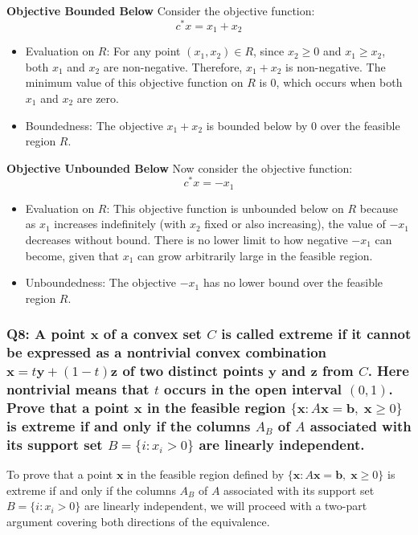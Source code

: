 \documentclass[8pt]{article}
\begin{document}
\textbf{Objective Bounded Below}
Consider the objective function:
\[
c^*x = x_1 + x_2
\]
\begin{itemize}
    \item Evaluation on \(R\): For any point \((x_1, x_2) \in R\), since \(x_2 \geq 0\) and \(x_1 \geq x_2\), both \(x_1\) and \(x_2\) are non-negative. Therefore, \(x_1 + x_2\) is non-negative. The minimum value of this objective function on \(R\) is \(0\), which occurs when both \(x_1\) and \(x_2\) are zero.
    \item Boundedness: The objective \(x_1 + x_2\) is bounded below by \(0\) over the feasible region \(R\).
\end{itemize}

\textbf{Objective Unbounded Below}
Now consider the objective function:
\[
c^*x = -x_1
\]
\begin{itemize}
    \item Evaluation on \(R\): This objective function is unbounded below on \(R\) because as \(x_1\) increases indefinitely (with \(x_2\) fixed or also increasing), the value of \(-x_1\) decreases without bound. There is no lower limit to how negative \(-x_1\) can become, given that \(x_1\) can grow arbitrarily large in the feasible region.
    \item Unboundedness: The objective \(-x_1\) has no lower bound over the feasible region \(R\).
\end{itemize}


\subsubsection*{Q8: A point \(\mathbf{x}\) of a convex set \(C\) is called extreme if it cannot be expressed as a nontrivial convex combination \(\mathbf{x} = t\mathbf{y} + (1 - t)\mathbf{z}\) of two distinct points \(\mathbf{y}\) and \(\mathbf{z}\) from \(C\). Here nontrivial means that \(t\) occurs in the open interval \((0, 1)\). Prove that a point \(\mathbf{x}\) in the feasible region \(\{\mathbf{x} : A\mathbf{x} = \mathbf{b}, \; \mathbf{x} \geq 0\}\) is extreme if and only if the columns \(A_B\) of \(A\) associated with its support set \(B = \{i : x_i > 0\}\) are linearly independent.}

To prove that a point \(\mathbf{x}\) in the feasible region defined by \(\{\mathbf{x} : A\mathbf{x} = \mathbf{b}, \; \mathbf{x} \geq 0\}\) is extreme if and only if the columns \(A_B\) of \(A\) associated with its support set \(B = \{i : x_i > 0\}\) are linearly independent, we will proceed with a two-part argument covering both directions of the equivalence.
\end{document}
